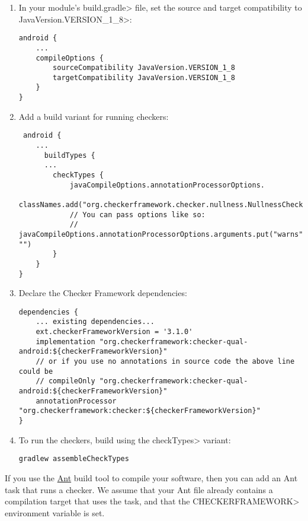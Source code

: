 \begin{enumerate}

\item In your module's \<build.gradle> file, set the source and target
  compatibility to \<JavaVersion.VERSION\_1\_8>:

\begin{Verbatim}
android {
    ...
    compileOptions {
        sourceCompatibility JavaVersion.VERSION_1_8
        targetCompatibility JavaVersion.VERSION_1_8
    }
}
\end{Verbatim}

\item Add a build variant for running checkers:

 \begin{Verbatim}
 android {
    ...
      buildTypes {
      ...
        checkTypes {
            javaCompileOptions.annotationProcessorOptions.
                    classNames.add("org.checkerframework.checker.nullness.NullnessChecker")
            // You can pass options like so:
            // javaCompileOptions.annotationProcessorOptions.arguments.put("warns", "")
        }
    }
}
\end{Verbatim}

\item Declare the Checker Framework dependencies:

\begin{mysmall}
\begin{Verbatim}
dependencies {
    ... existing dependencies...
    ext.checkerFrameworkVersion = '3.1.0'
    implementation "org.checkerframework:checker-qual-android:${checkerFrameworkVersion}"
    // or if you use no annotations in source code the above line could be
    // compileOnly "org.checkerframework:checker-qual-android:${checkerFrameworkVersion}"
    annotationProcessor "org.checkerframework:checker:${checkerFrameworkVersion}"
}
\end{Verbatim}
\end{mysmall}

\item To run the checkers, build using the \<checkTypes> variant:
\begin{Verbatim}
gradlew assembleCheckTypes
\end{Verbatim}

\end{enumerate}



If you use the \href{http://ant.apache.org/}{Ant} build tool to compile
your software, then you can add an Ant task that runs a checker.  We assume
that your Ant file already contains a compilation target that uses the
 task, and that the \<CHECKERFRAMEWORK> environment variable is set.

